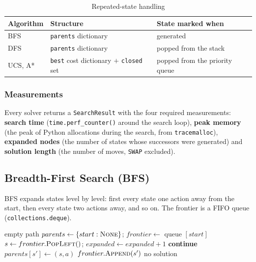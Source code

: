 \begin{table}[H]
\centering
\caption{Repeated-state handling}
\label{tab:visited}
\begin{tabular}{lll}
\toprule
\textbf{Algorithm} & \textbf{Structure} & \textbf{State marked when} \\
\midrule
BFS & \texttt{parents} dictionary & generated \\
DFS & \texttt{parents} dictionary & popped from the stack \\
UCS, A* & \texttt{best} cost dictionary $+$ \texttt{closed} set & popped from the priority queue \\
\bottomrule
\end{tabular}
\end{table}

\subsubsection{Measurements}

Every solver returns a \texttt{SearchResult} with the four required measurements:
\textbf{search time} (\texttt{time.perf\_counter()} around the search loop),
\textbf{peak memory} (the peak of Python allocations during the search, from
\texttt{tracemalloc}), \textbf{expanded nodes} (the number of states whose successors were
generated) and \textbf{solution length} (the number of moves, \texttt{SWAP} excluded).

\subsection{Breadth-First Search (BFS)}

BFS expands states level by level: first every state one action away from the start, then every
state two actions away, and so on. The frontier is a FIFO queue (\texttt{collections.deque}).

\begin{algorithm}[H]
\caption{BFS (\texttt{solvers/bfs.py})}
\label{alg:bfs}
\begin{algorithmic}[1]
 \Return empty path \EndIf
\State $parents \gets \{start: \textsc{None}\}$; $frontier \gets$ queue $[start]$
  \State $s \gets frontier.\textsc{PopLeft}()$; $expanded \gets expanded + 1$
     \textbf{continue} \EndIf
    \State $parents[s'] \gets (s, a)$
     \Return {} \EndIf
    \State $frontier.\textsc{Append}(s')$
  \EndFor
\EndWhile
\State \Return no solution
\end{algorithmic}
\end{algorithm}

